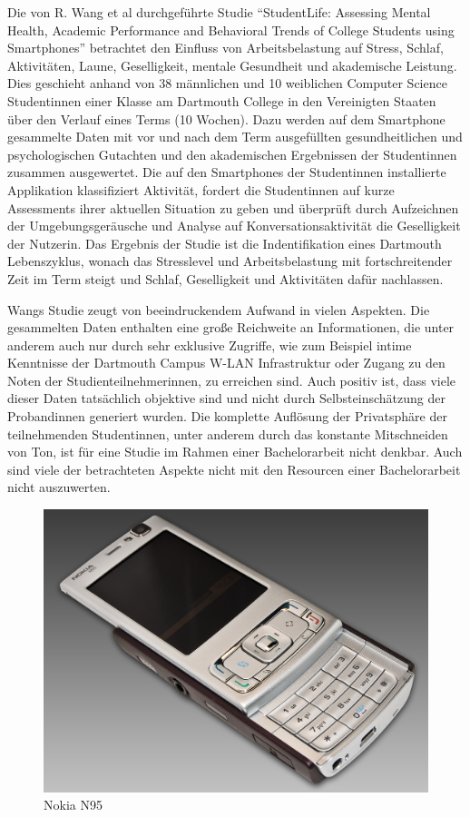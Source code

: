 Die von R. Wang et al durchgeführte Studie "`StudentLife: Assessing Mental Health, Academic Performance and Behavioral Trends of College Students using Smartphones"'
betrachtet den Einfluss von Arbeitsbelastung auf Stress, Schlaf, Aktivitäten, Laune, Geselligkeit, mentale Gesundheit und akademische Leistung.
Dies geschieht anhand von 38 männlichen und 10 weiblichen Computer Science Studentinnen einer Klasse am Dartmouth College in den Vereinigten Staaten über den Verlauf eines Terms (10 Wochen).
Dazu werden auf dem Smartphone gesammelte Daten mit vor und nach dem Term ausgefüllten gesundheitlichen und psychologischen Gutachten und den akademischen Ergebnissen der Studentinnen zusammen ausgewertet.
Die auf den Smartphones der Studentinnen installierte Applikation klassifiziert Aktivität, fordert die Studentinnen auf kurze Assessments ihrer aktuellen Situation zu geben und überprüft durch Aufzeichnen der Umgebungsgeräusche und Analyse auf Konversationsaktivität die Geselligkeit der Nutzerin.
Das Ergebnis der Studie ist die Indentifikation eines Dartmouth Lebenszyklus, wonach das Stresslevel und Arbeitsbelastung mit fortschreitender Zeit im Term steigt und Schlaf, Geselligkeit und Aktivitäten dafür nachlassen.
\par
Wangs Studie zeugt von beeindruckendem Aufwand in vielen Aspekten. 
Die gesammelten Daten enthalten eine große Reichweite an Informationen, die unter anderem auch nur durch sehr exklusive Zugriffe, wie zum Beispiel intime Kenntnisse der Dartmouth Campus W-LAN Infrastruktur oder Zugang zu den Noten der Studienteilnehmerinnen, zu erreichen sind.
Auch positiv ist, dass viele dieser Daten tatsächlich objektive sind und nicht durch Selbsteinschätzung der Probandinnen generiert wurden.
Die komplette Auflösung der Privatsphäre der teilnehmenden Studentinnen, unter anderem durch das konstante Mitschneiden von Ton, ist für eine Studie im Rahmen einer Bachelorarbeit nicht denkbar. 
Auch sind viele der betrachteten Aspekte nicht mit den Resourcen einer Bachelorarbeit nicht auszuwerten.



\begin{figure}[h]
    \centering
    \includegraphics[width=\textwidth]{images/N95_Front-slide-open}
    \caption{Nokia N95\cite{nokiaPhone}}
    \label{nokia}
\end{figure}

